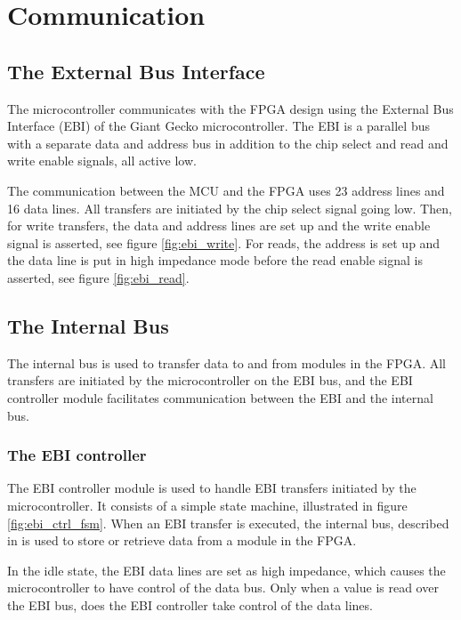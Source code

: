 \FloatBarrier
\section{Communication}\label{section:fpga-buses}

\subsection{The External Bus Interface}
The microcontroller communicates with the FPGA design using the External Bus
Interface (EBI) of the Giant Gecko microcontroller. The EBI is a parallel bus
with a separate data and address bus in addition to the chip select and read and
write enable signals, all active low\cite{efm_ebi}.

The communication between the MCU and the FPGA uses 23 address lines and 16
data lines. All transfers are initiated by the chip select signal going low.
Then, for write transfers, the data and address lines are set up and the
write enable signal is asserted, see figure \ref{fig:ebi_write}. For reads,
the address is set up and the data line is put in high impedance mode before
the read enable signal is asserted, see figure \ref{fig:ebi_read}.




\FloatBarrier
\subsection{The Internal Bus}

The internal bus is used to transfer data to and from modules in the FPGA.
All transfers are initiated by the microcontroller on the EBI bus, and the
EBI controller module facilitates communication between the EBI and the
internal bus.

\subsubsection{The EBI controller}
The EBI controller module is used to handle EBI transfers initiated by the
microcontroller. It consists of a simple state machine, illustrated in
figure \ref{fig:ebi_ctrl_fsm}. When an EBI transfer is executed, the
internal bus, described in is used to store or retrieve data from a module
in the FPGA.

In the idle state, the EBI data lines are set as high impedance, which
causes the microcontroller to have control of the data bus. Only when
a value is read over the EBI bus, does the EBI controller take control of
the data lines.

